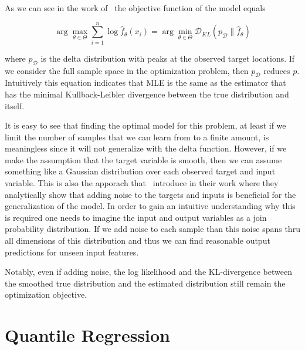 As we can see in the work of~\cite{rothfuss2019noise} the objective function of the model equals

\begin{equation}
    \arg \max _{\theta \in \Theta} \sum_{i=1}^n \log
    \hat{f}_\theta\left(x_i\right)=\arg \min _{\theta \in \Theta}
    \mathcal{D}_{K
        L}\left(p_{\mathcal{D}} \| \hat{f}_\theta\right)
    \label{eq:kl_divergence_mll}
\end{equation}

where $p_{\mathcal{D}}$ is the delta distribution with peaks at the observed target locations. If we consider the full sample space in the optimization problem, then $p_{\mathcal{D}}$ reduces $p$. Intuitively this equation indicates that MLE is the same as the estimator that has the minimal Kullback-Leibler divergence between the true distribution and itself.

It is easy to see that finding the optimal model for this problem, at least if we limit the number of samples that we can learn from to a finite amount, is meaningless since it will not generalize with the delta function. However, if we make the assumption that the target variable is smooth, then we can assume something like a Gaussian distribution over each observed target and input variable. This is also the apporach that~\cite{rothfuss2019noise} introduce in their work where they analytically show that adding noise to the targets and inputs is beneficial for the generalization of the model. In order to gain an intuitive understanding why this is required one needs to imagine the input and output variables as a join probability distribution. If we add noise to each sample than this noise spans thru all dimensions of this distribution and thus we can find reasonable output predictions for unseen input features.

Notably, even if adding noise, the log likelihood and the KL-divergence between the smoothed true distribution and the estimated distribution still remain the optimization objective.

\section{Quantile Regression}\label{sec:qr}

